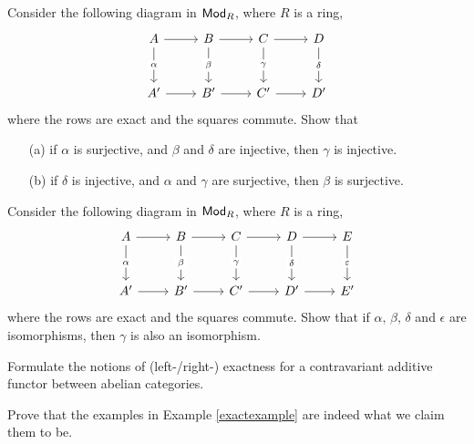 
\begin{problem}\label{prob C.8a}
Consider the following diagram in $\mathsf{Mod}_R$, where $R$ is a ring,
\[\begin{tikzcd}
  A\arrow[d,"\alpha" description] \rar & B \rar\arrow[d,"\beta" description] & C \rar\arrow[d,"\gamma" description] & D\arrow[d,"\delta" description] \\[1em]
  A' \rar & B' \rar & C' \rar & D'
\end{tikzcd}\]
where the rows are exact and the squares commute. Show that
\begin{itemize}
\item[(a)] if $\alpha$ is surjective, and $\beta$ and $\delta$ are injective, then $\gamma$ is injective.
\item[(b)] if $\delta$ is injective, and $\alpha$ and $\gamma$ are surjective, then $\beta$ is surjective.
\end{itemize}
\end{problem}

\vspace*{0.1in}

\begin{problem}\label{prob C.8a}
Consider the following diagram in $\mathsf{Mod}_R$, where $R$ is a ring,
\[\begin{tikzcd}
  A\arrow[d,"\alpha" description] \rar & B \rar\arrow[d,"\beta" description] & C \rar\arrow[d,"\gamma" description] & D\rar\arrow[d,"\delta" description] & E\arrow[d,"\epsilon" description] \\[1em]
  A' \rar & B' \rar & C' \rar & D' \rar & E'
\end{tikzcd}\]
where the rows are exact and the squares commute. Show that if $\alpha,\,\beta,\,\delta$ and $\epsilon$ are isomorphisms, then $\gamma$ is also an isomorphism.
\end{problem}

\vspace*{0.1in}

\begin{problem}\label{prob C.9}
Formulate the notions of (left-/right-) exactness for a contravariant additive functor between abelian categories.
\end{problem}

\vspace*{0.1in}

\begin{problem}\label{prob C.10}
Prove that the examples in Example \ref{exactexample} are indeed what we claim them to be.
\end{problem}

